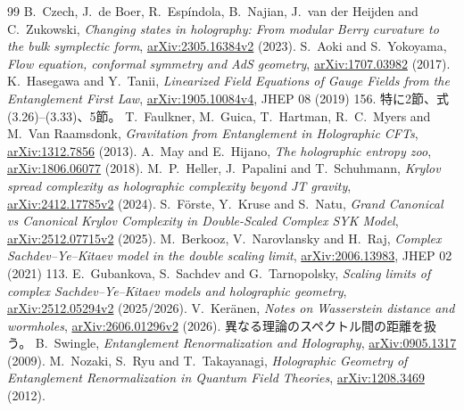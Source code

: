 \documentclass[a4paper,11pt]{ltjsarticle}
\numberwithin{equation}{section}
\begin{document}
\begin{thebibliography}{99}
 B.~Czech, J.~de Boer, R.~Esp\'indola, B.~Najian, J.~van der Heijden and C.~Zukowski, \emph{Changing states in holography: From modular Berry curvature to the bulk symplectic form}, \href{https://arxiv.org/abs/2305.16384v2}{arXiv:2305.16384v2} (2023).
 S.~Aoki and S.~Yokoyama, \emph{Flow equation, conformal symmetry and AdS geometry}, \href{https://arxiv.org/abs/1707.03982}{arXiv:1707.03982} (2017).
 K.~Hasegawa and Y.~Tanii, \emph{Linearized Field Equations of Gauge Fields from the Entanglement First Law}, \href{https://arxiv.org/abs/1905.10084v4}{arXiv:1905.10084v4}, JHEP 08 (2019) 156. 特に2節、式(3.26)--(3.33)、5節。
 T.~Faulkner, M.~Guica, T.~Hartman, R.~C.~Myers and M.~Van Raamsdonk, \emph{Gravitation from Entanglement in Holographic CFTs}, \href{https://arxiv.org/abs/1312.7856}{arXiv:1312.7856} (2013).
 A.~May and E.~Hijano, \emph{The holographic entropy zoo}, \href{https://arxiv.org/abs/1806.06077}{arXiv:1806.06077} (2018).
 M.~P.~Heller, J.~Papalini and T.~Schuhmann, \emph{Krylov spread complexity as holographic complexity beyond JT gravity}, \href{https://arxiv.org/abs/2412.17785v2}{arXiv:2412.17785v2} (2024).
 S.~F\"orste, Y.~Kruse and S.~Natu, \emph{Grand Canonical vs Canonical Krylov Complexity in Double-Scaled Complex SYK Model}, \href{https://arxiv.org/abs/2512.07715v2}{arXiv:2512.07715v2} (2025).
 M.~Berkooz, V.~Narovlansky and H.~Raj, \emph{Complex Sachdev--Ye--Kitaev model in the double scaling limit}, \href{https://arxiv.org/abs/2006.13983}{arXiv:2006.13983}, JHEP 02 (2021) 113.
 E.~Gubankova, S.~Sachdev and G.~Tarnopolsky, \emph{Scaling limits of complex Sachdev--Ye--Kitaev models and holographic geometry}, \href{https://arxiv.org/abs/2512.05294v2}{arXiv:2512.05294v2} (2025/2026).
 V.~Ker\"anen, \emph{Notes on Wasserstein distance and wormholes}, \href{https://arxiv.org/abs/2606.01296v2}{arXiv:2606.01296v2} (2026). 異なる理論のスペクトル間の距離を扱う。
 B.~Swingle, \emph{Entanglement Renormalization and Holography}, \href{https://arxiv.org/abs/0905.1317}{arXiv:0905.1317} (2009).
 M.~Nozaki, S.~Ryu and T.~Takayanagi, \emph{Holographic Geometry of Entanglement Renormalization in Quantum Field Theories}, \href{https://arxiv.org/abs/1208.3469}{arXiv:1208.3469} (2012).
\end{thebibliography}
\end{document}

